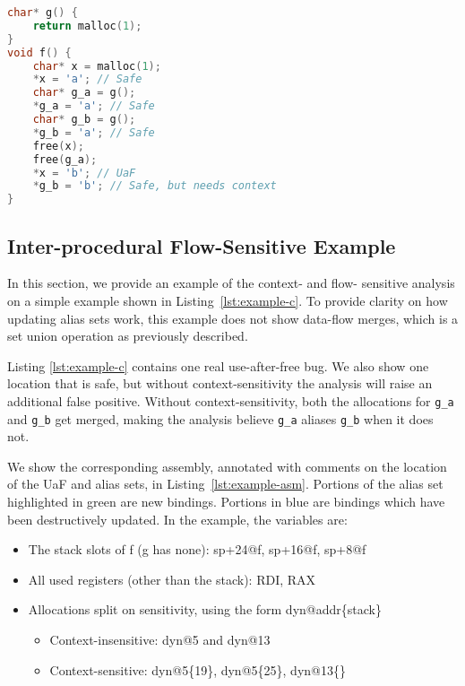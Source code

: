 \begin{lstlisting}[language=C, float=t, caption={Example (C)}, label=lst:example-c]
char* g() {
	return malloc(1);
}
void f() {
	char* x = malloc(1);
	*x = 'a'; // Safe
	char* g_a = g();
	*g_a = 'a'; // Safe
	char* g_b = g();
	*g_b = 'a'; // Safe
	free(x);
	free(g_a);
	*x = 'b'; // UaF
	*g_b = 'b'; // Safe, but needs context
}
\end{lstlisting}

\subsection{Inter-procedural Flow-Sensitive Example}
In this section, we provide an example of the context- and flow-
sensitive analysis on a simple example shown in
Listing~\ref{lst:example-c}. To provide clarity on how updating alias
sets work, this example does not show data-flow merges, which is a set
union operation as previously described.

Listing \ref{lst:example-c} contains one real use-after-free bug.
We also show one location that is safe, but without context-sensitivity the analysis will raise an additional false positive.
Without context-sensitivity, both the allocations for \texttt{g\_a} and \texttt{g\_b} get merged, making the analysis believe \texttt{g\_a} aliases \texttt{g\_b} when it does not.




We show the corresponding assembly, annotated with comments on the location of the UaF and alias sets, in Listing~\ref{lst:example-asm}.
Portions of the alias set highlighted in green are new bindings.
Portions in blue are bindings which have been destructively updated.
In the example, the variables are:
\begin{itemize}
	\item The stack slots of f (g has none): sp+24@f, sp+16@f, sp+8@f
	\item All used registers (other than the stack): RDI, RAX
	\item Allocations split on sensitivity, using the form dyn@addr\{stack\}
          \begin{itemize}
          \item Context-insensitive: dyn@5 and dyn@13
          \item Context-sensitive: dyn@5\{19\}, dyn@5\{25\}, dyn@13\{\}
          \end{itemize}
\end{itemize}

